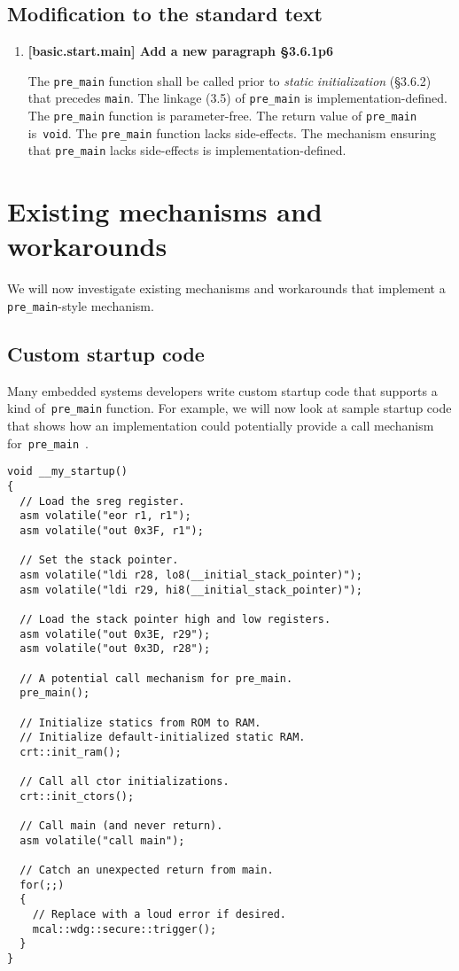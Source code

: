 \documentclass[11pt]{article}
\begin{document}
\subsection*{Modification to the standard text}
\begin{enumerate}

  \item \textbf{[basic.start.main] Add a new paragraph \S3.6.1p6}

  The \lstinline{pre_main} function shall be called prior to
  \emph{static} \emph{initialization} (\S3.6.2)
  that precedes \lstinline{main}.
  The linkage (3.5) of \lstinline{pre_main} is implementation-defined.
  The \lstinline{pre_main} function is parameter-free.
  The return value of \lstinline{pre_main} is~\lstinline{void}.
  The \lstinline{pre_main} function lacks side-effects.
  The mechanism ensuring that \lstinline{pre_main} lacks
  side-effects is implementation-defined.

\end{enumerate}

\section{Existing mechanisms and workarounds}

We will now investigate existing mechanisms and
workarounds that implement a \lstinline{pre_main}-style
mechanism.

\subsection*{Custom startup code}

Many embedded systems developers write custom startup
code that supports a kind of~\lstinline{pre_main} function.
For example, we will now look at sample startup code that
shows how an implementation could potentially provide a call mechanism
for~\lstinline{pre_main}~\cite{bib:kormanyos2013,bib:kormanyosgit2015}.
  
\begin{lstlisting}
void __my_startup()
{
  // Load the sreg register.
  asm volatile("eor r1, r1");
  asm volatile("out 0x3F, r1");

  // Set the stack pointer.
  asm volatile("ldi r28, lo8(__initial_stack_pointer)");
  asm volatile("ldi r29, hi8(__initial_stack_pointer)");

  // Load the stack pointer high and low registers.
  asm volatile("out 0x3E, r29");
  asm volatile("out 0x3D, r28");

  // A potential call mechanism for pre_main.
  pre_main();

  // Initialize statics from ROM to RAM.
  // Initialize default-initialized static RAM.
  crt::init_ram();

  // Call all ctor initializations.
  crt::init_ctors();

  // Call main (and never return).
  asm volatile("call main");

  // Catch an unexpected return from main.
  for(;;)
  {
    // Replace with a loud error if desired.
    mcal::wdg::secure::trigger();
  }
}
\end{lstlisting}
  
\end{document}
